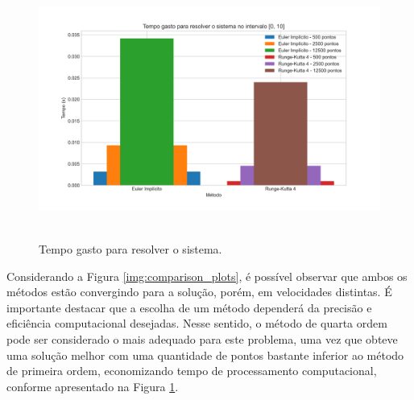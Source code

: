 \begin{figure}[H]
	\centering
    \mbox{
        \includegraphics[width=14cm]{predator-prey/predator_prey-300dpi-time-comparison.png}
    }
	\caption{Tempo gasto para resolver o sistema.}
    \label{img:pp-times}
\end{figure}

Considerando a Figura \ref{img:comparison_plots}, é possível observar que ambos os métodos estão convergindo para a solução, porém, em velocidades distintas. É importante destacar que a escolha de um método dependerá da precisão e eficiência computacional desejadas. Nesse sentido, o método de quarta ordem pode ser considerado o mais adequado para este problema, uma vez que obteve uma solução melhor com uma quantidade de pontos bastante inferior ao método de primeira ordem, economizando tempo de processamento computacional, conforme apresentado na Figura \ref{img:pp-times}.